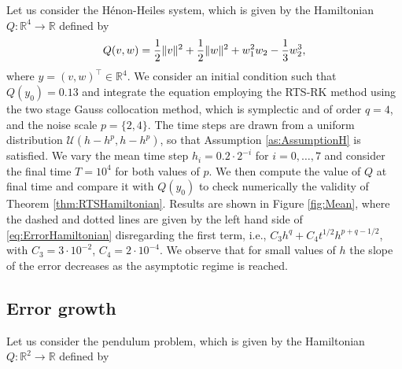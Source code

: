 \documentclass{siamart1116}
\numberwithin{theorem}{section}
\DeclarePairedDelimiter{\norm}{\|}{\|}
\newcommand{\R}{\mathbb{R}}
\newcommand{\corr}[1]{{\color{red}#1}}
\begin{document}
Let us consider the Hénon-Heiles system, which is given by the Hamiltonian $Q \colon \R^4 \to \R$ defined by
\corr{
\begin{equation}\label{eq:HamHH}
	Q(v, w) = \frac{1}{2}\norm{v}^2 + \frac{1}{2}\norm{w}^2 + w_1^2w_2 - \frac{1}{3}w_2^3,
\end{equation}
where $y = (v, w)^\top \in \R^4$.} We consider an initial condition such that $Q(y_0) = 0.13$ and integrate the equation employing the RTS-RK method \corr{using the two stage Gauss collocation method, which is symplectic and of order $q = 4$,} and the noise scale $p = \{2, 4\}$. \corr{The time steps are drawn from a uniform distribution $\mathcal{U}(h-h^p, h-h^p)$, so that Assumption \ref{as:AssumptionH} is satisfied}. We vary the mean time step $h_i = 0.2 \cdot 2^{-i}$ for $i = 0, \ldots, 7$ and consider the final time $T = 10^4$ for both values of $p$. We then compute the value of $Q$ at final time and compare it with $Q(y_0)$ to check numerically the validity of Theorem \ref{thm:RTSHamiltonian}. Results are shown in Figure \ref{fig:Mean}, where the dashed and dotted lines are given by \corr{the left hand side of \eqref{eq:ErrorHamiltonian} disregarding the first term, i.e., $C_3h^q + C_4t^{1/2}h^{p+q-1/2}$, with $C_3 = 3\cdot 10^{-2}$, $C_4 = 2\cdot 10^{-4}$}. \corr{We observe} that for small values of $h$ the slope of the error decreases as the asymptotic regime is reached.

\subsection{Error growth} Let us consider the pendulum problem, which is given by the Hamiltonian $Q \colon \R^2 \to \R$ defined by
\end{document}

